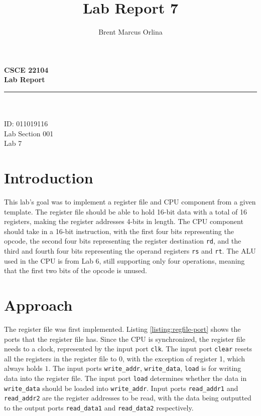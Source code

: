 \documentclass[11pt]{report}
\makeatletter
\newcommand{\@labsection}{000}
\newcommand{\labsection}[1]{
    \renewcommand{\@labsection}{#1}
}
\newcommand{\@labnumber}{0}
\newcommand{\labnumber}[1]{
    \renewcommand{\@labnumber}{#1}
}
\newcommand{\@shortsubmitted}{1/1/70}
\newcommand{\shortsubmitted}[1]{
    \renewcommand{\@shortsubmitted}{#1}
}
\renewcommand{\maketitle}{
    \newgeometry{left=1in, right=1in, top=1.75in, textheight=8.25in}
    \singlespacing
    \begin{center}
        {\huge \bf CSCE 22104} \\
        \vspace{2.5em}
        {\Large \bf Lab Report} \\
        \vspace{2em}
        \noindent\rule{20em}{0.4pt} \\
        \vspace{1em}
        {\Large \@author} \\
        \vspace{.75em}
        {\normalsize ID: 011019116} \\
        \vspace{.75em}
        {\normalsize Lab Section \@labsection} \\
        \vspace{.75em}
        {\normalsize Lab \@labnumber} \\
    \end{center}
    \newpage
    \restoregeometry
}
\makeatother
\begin{document}
\title{Lab Report 7}
\author{Brent Marcus Orlina}

\labsection{001}
\labnumber{7}

\shortsubmitted{4/2/25}

\maketitle

\section*{Introduction}
This lab's goal was to implement a register file and CPU component from a given template. The
register file should be able to hold 16-bit data with a total of 16 registers, making the register
addresses 4-bits in length. The CPU component should take in a 16-bit instruction, with the first
four bits representing the opcode, the second four bits representing the register destination
\verb|rd|, and the third and fourth four bits representing the operand registers \verb|rs| and
\verb|rt|. The ALU used in the CPU is from Lab 6, still supporting only four operations, meaning
that the first two bits of the opcode is unused.

\newpage

\section*{Approach}

The register file was first implemented. Listing \ref{listing:regfile-port} shows the ports that the
register file has. Since the CPU is synchronized, the register file needs to a clock, represented by
the input port \verb|clk|. The input port \verb|clear| resets all the registers in the register file
to $0$, with the exception of register 1, which always holds $1$. The input ports \verb|write_addr|,
\verb|write_data|, \verb|load| is for writing data into the register file. The input port
\verb|load| determines whether the data in \verb|write_data| should be loaded into
\verb|write_addr|. Input ports \verb|read_addr1| and \verb|read_addr2| are the register addresses to
be read, with the data being outputted to the output ports \verb|read_data1| and \verb|read_data2|
respectively.
\end{document}
